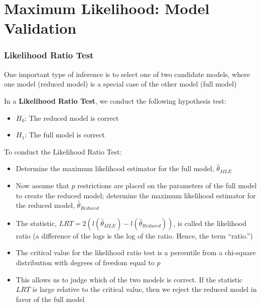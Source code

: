 \documentclass{beamer}
\begin{document}
\section{Maximum Likelihood: Model Validation}

\begin{frame}%
\frametitle{Likelihood Ratio Test}
One important type of inference is to select one of two candidate models, where one model (reduced model) is a special case of the other model (full model)

In a \textbf{Likelihood Ratio Test}, we conduct the following hypothesis test:
\begin{itemize}
\item $H_0$: The reduced model is correct
\item $H_1$: The full model is correct \vspace{2mm}
\end{itemize} %

To conduct the Likelihood Ratio Test: %

\begin{itemize}
\item Determine the maximum likelihood estimator for the full model, $\hat{\theta}_{MLE}$ %
\item Now assume that $p$ restrictions are placed on the parameters of the full model to create the reduced model; determine the maximum likelihood estimator for the reduced model, $\hat{\theta}_{Reduced}$ %
\item The statistic, $LRT= 2 \left( l(\hat{\theta}_{MLE}) - l(\hat{\theta}_{Reduced}) \right)$, is called the likelihood ratio (a difference of the logs is the log of the ratio. Hence, the term ``ratio.'') %
\item The critical value for the likelihood ratio test is a percentile from a chi-square distribution with degrees of freedom equal to $p$ %
\item This allows us to judge which of the two models is correct. If the statistic $LRT$ is large relative to the critical value, then we reject the reduced model in favor of the full model
\end{itemize}
\end{frame}
\end{document}
